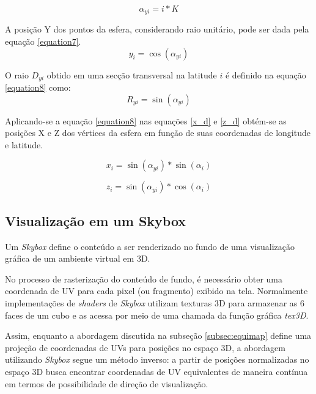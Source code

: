 \documentclass[conference]{IEEEtran}
\begin{document}
\begin{equation}
\alpha_{yi} = i * K
\label{equation6}
\end{equation}

A posição Y dos pontos da esfera, considerando raio unitário, pode ser dada pela equação \ref{equation7}.
\begin{equation}
y_{i} = \cos(\alpha_{yi})
\label{equation7}
\end{equation}

O raio $D_{yi}$ obtido em uma secção transversal na latitude $i$ é definido na equação \ref{equation8} como:
\begin{equation}
R_{yi} = \sin(\alpha_{yi})
\label{equation8}
\end{equation}

Aplicando-se a equação \ref{equation8} nas equações \ref{x_d} e \ref{z_d} obtém-se as posições X e Z dos vértices da esfera em função de suas coordenadas de longitude e latitude.

\begin{equation}
x_{i} = \sin(\alpha_{yi}) * \sin(\alpha_i)
\label{equation9}
\end{equation}

\begin{equation}
z_{i} = \sin(\alpha_{yi}) * \cos(\alpha_i)
\label{equation10}
\end{equation}

\subsection{Visualização em um Skybox} \label{subsec:skyboxviz}

Um \textit{Skybox} define o conteúdo a ser renderizado no fundo de uma visualização gráfica de um ambiente virtual em 3D.

No processo de rasterização do conteúdo de fundo, é necessário obter uma coordenada de UV para cada pixel (ou fragmento) exibido na tela. Normalmente implementações de \textit{shaders} de \textit{Skybox} utilizam texturas 3D para armazenar as 6 faces de um cubo e as acessa por meio de uma chamada da função gráfica \textit{tex3D}.

Assim, enquanto a abordagem discutida na subseção \ref{subsec:equimap} define uma projeção de coordenadas de UVs para posições no espaço 3D, a abordagem utilizando \textit{Skybox} segue um método inverso: a partir de posições normalizadas no espaço 3D busca encontrar coordenadas de UV equivalentes de maneira contínua em termos de possibilidade de direção de visualização.
\end{document}
